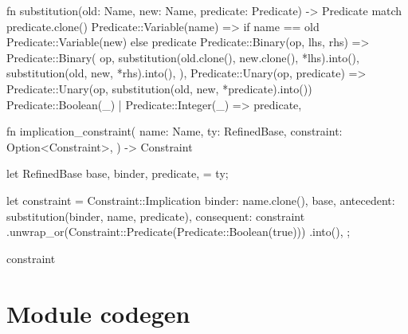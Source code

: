 \documentclass[
  oneside,
  english,
  coorientadorbanca,
  noabntexcite
]{ufsc-thesis-rn46-2019}
\begin{document}
\begin{rustcode}
fn substitution(old: Name, new: Name, predicate: Predicate) -> Predicate {
    match predicate.clone() {
        Predicate::Variable(name) => {
            if name == old {
                Predicate::Variable(new)
            } else {
                predicate
            }
        }
        Predicate::Binary(op, lhs, rhs) => Predicate::Binary(
            op,
            substitution(old.clone(), new.clone(), *lhs).into(),
            substitution(old, new, *rhs).into(),
        ),
        Predicate::Unary(op, predicate) => {
            Predicate::Unary(op, substitution(old, new, *predicate).into())
        }
        Predicate::Boolean(_) | Predicate::Integer(_) => predicate,
    }
}

fn implication_constraint(
    name: Name,
    ty: RefinedBase,
    constraint: Option<Constraint>,
) -> Constraint {
    let RefinedBase {
        base,
        binder,
        predicate,
    } = ty;

    let constraint = Constraint::Implication {
        binder: name.clone(),
        base,
        antecedent: substitution(binder, name, predicate),
        consequent: constraint
            .unwrap_or(Constraint::Predicate(Predicate::Boolean(true)))
            .into(),
    };

    constraint
} 
\end{rustcode}

\section{Module codegen}
\end{document}
